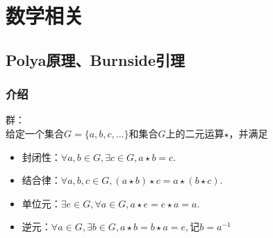 %
%

\chapter{数学相关}

\section{Polya原理、Burnside引理}

\subsection{介绍}
群：\\
给定一个集合$G=\{a,b,c,...\}$和集合$G$上的二元运算$\star$，并满足\\
\begin{itemize}
\item 封闭性：$\forall a,b\in G,\exists c \in G,a \star b = c.$
\item 结合律：$\forall a,b,c \in G,(a \star b) \star c= a \star (b \star c).$
\item 单位元：$\exists e \in G,\forall a \in G, a \star e = e \star a = a.$
\item 逆元：$\forall a \in G,\exists b \in G, a \star b = b \star a = e,记b=a^{-1}$
\end{itemize}


